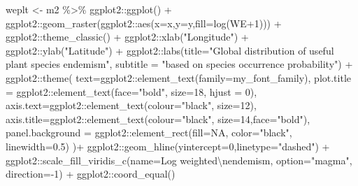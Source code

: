 \documentclass[
]{article}
\newenvironment{Shaded}{\begin{snugshade}}{\end{snugshade}}
\newcommand{\AttributeTok}[1]{\textcolor[rgb]{0.77,0.63,0.00}{#1}}
\newcommand{\ConstantTok}[1]{\textcolor[rgb]{0.00,0.00,0.00}{#1}}
\newcommand{\DecValTok}[1]{\textcolor[rgb]{0.00,0.00,0.81}{#1}}
\newcommand{\FloatTok}[1]{\textcolor[rgb]{0.00,0.00,0.81}{#1}}
\newcommand{\FunctionTok}[1]{\textcolor[rgb]{0.00,0.00,0.00}{#1}}
\newcommand{\NormalTok}[1]{#1}
\newcommand{\OtherTok}[1]{\textcolor[rgb]{0.56,0.35,0.01}{#1}}
\newcommand{\SpecialCharTok}[1]{\textcolor[rgb]{0.00,0.00,0.00}{#1}}
\newcommand{\StringTok}[1]{\textcolor[rgb]{0.31,0.60,0.02}{#1}}
\begin{document}
\begin{Shaded}
\begin{Highlighting}[]
\NormalTok{weplt }\OtherTok{\textless{}{-}}\NormalTok{ m2 }\SpecialCharTok{\%\textgreater{}\%}
\NormalTok{  ggplot2}\SpecialCharTok{::}\FunctionTok{ggplot}\NormalTok{() }\SpecialCharTok{+}
\NormalTok{  ggplot2}\SpecialCharTok{::}\FunctionTok{geom\_raster}\NormalTok{(ggplot2}\SpecialCharTok{::}\FunctionTok{aes}\NormalTok{(}\AttributeTok{x=}\NormalTok{x,}\AttributeTok{y=}\NormalTok{y,}\AttributeTok{fill=}\FunctionTok{log}\NormalTok{(WE}\SpecialCharTok{+}\DecValTok{1}\NormalTok{))) }\SpecialCharTok{+}
\NormalTok{  ggplot2}\SpecialCharTok{::}\FunctionTok{theme\_classic}\NormalTok{() }\SpecialCharTok{+}
\NormalTok{  ggplot2}\SpecialCharTok{::}\FunctionTok{xlab}\NormalTok{(}\StringTok{"Longitude"}\NormalTok{) }\SpecialCharTok{+}\NormalTok{ ggplot2}\SpecialCharTok{::}\FunctionTok{ylab}\NormalTok{(}\StringTok{"Latitude"}\NormalTok{) }\SpecialCharTok{+}
\NormalTok{  ggplot2}\SpecialCharTok{::}\FunctionTok{labs}\NormalTok{(}\AttributeTok{title=}\StringTok{"Global distribution of useful plant species endemism"}\NormalTok{,}
                \AttributeTok{subtitle =} \StringTok{"based on species occurrence probability"}\NormalTok{) }\SpecialCharTok{+}
\NormalTok{  ggplot2}\SpecialCharTok{::}\FunctionTok{theme}\NormalTok{(}
    \AttributeTok{text=}\NormalTok{ggplot2}\SpecialCharTok{::}\FunctionTok{element\_text}\NormalTok{(}\AttributeTok{family=}\NormalTok{my\_font\_family),}
    \AttributeTok{plot.title =}\NormalTok{ ggplot2}\SpecialCharTok{::}\FunctionTok{element\_text}\NormalTok{(}\AttributeTok{face=}\StringTok{"bold"}\NormalTok{, }\AttributeTok{size=}\DecValTok{18}\NormalTok{, }\AttributeTok{hjust =} \DecValTok{0}\NormalTok{),}
    \AttributeTok{axis.text=}\NormalTok{ggplot2}\SpecialCharTok{::}\FunctionTok{element\_text}\NormalTok{(}\AttributeTok{colour=}\StringTok{"black"}\NormalTok{, }\AttributeTok{size=}\DecValTok{12}\NormalTok{),}
    \AttributeTok{axis.title=}\NormalTok{ggplot2}\SpecialCharTok{::}\FunctionTok{element\_text}\NormalTok{(}\AttributeTok{colour=}\StringTok{"black"}\NormalTok{, }\AttributeTok{size=}\DecValTok{14}\NormalTok{,}\AttributeTok{face=}\StringTok{"bold"}\NormalTok{),}
    \AttributeTok{panel.background =}\NormalTok{ ggplot2}\SpecialCharTok{::}\FunctionTok{element\_rect}\NormalTok{(}\AttributeTok{fill=}\ConstantTok{NA}\NormalTok{, }\AttributeTok{color=}\StringTok{"black"}\NormalTok{, }\AttributeTok{linewidth=}\FloatTok{0.5}\NormalTok{)}
\NormalTok{  )}\SpecialCharTok{+}
\NormalTok{  ggplot2}\SpecialCharTok{::}\FunctionTok{geom\_hline}\NormalTok{(}\AttributeTok{yintercept=}\DecValTok{0}\NormalTok{,}\AttributeTok{linetype=}\StringTok{"dashed"}\NormalTok{) }\SpecialCharTok{+}
\NormalTok{  ggplot2}\SpecialCharTok{::}\FunctionTok{scale\_fill\_viridis\_c}\NormalTok{(}\AttributeTok{name=}\StringTok{\textquotesingle{}Log weighted}\SpecialCharTok{\textbackslash{}n}\StringTok{endemism\textquotesingle{}}\NormalTok{,}
                                \AttributeTok{option=}\StringTok{"magma"}\NormalTok{,}
                                \AttributeTok{direction=}\SpecialCharTok{{-}}\DecValTok{1}\NormalTok{) }\SpecialCharTok{+}
\NormalTok{  ggplot2}\SpecialCharTok{::}\FunctionTok{coord\_equal}\NormalTok{()}


\end{Highlighting}
\end{Shaded}
\end{document}
